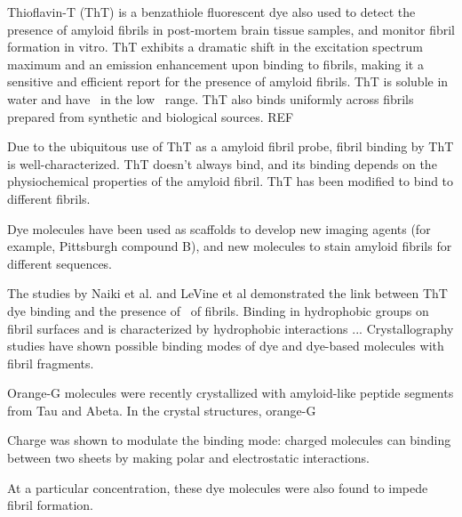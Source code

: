 Thioflavin-T (ThT) is a benzathiole fluorescent dye also used to detect the presence of amyloid fibrils in post-mortem brain tissue samples, and monitor fibril formation in vitro. ThT exhibits a dramatic shift in the excitation spectrum maximum and an emission enhancement upon binding to fibrils, making it a sensitive and efficient report for the presence of amyloid fibrils.  ThT is soluble in water and have \KD\ in the low \micromolar\ range.  ThT also binds uniformly across fibrils prepared from synthetic and biological sources.
REF

Due to the ubiquitous use of ThT as a amyloid fibril probe, fibril binding by ThT is well-characterized.  ThT doesn't always bind, and its binding depends on the physiochemical properties of the amyloid fibril.  ThT has been modified to bind to different fibrils.\cite{XXX}

Dye molecules have been used as scaffolds to develop new imaging agents (for example, Pittsburgh compound B), and new molecules to stain amyloid fibrils for different sequences. 


The studies by Naiki et al. and LeVine et al demonstrated the link between ThT dye binding and the presence of \crossbs\ of fibrils. Binding in hydrophobic groups on fibril surfaces and is characterized by hydrophobic interactions ...
Crystallography studies have shown possible binding modes of dye and dye-based molecules with fibril fragments.\cite{XXX}

Orange-G molecules were recently crystallized with amyloid-like peptide segments from Tau and Abeta.  In the crystal structures, orange-G 

Charge was shown to modulate the binding mode: charged molecules can binding between two sheets by making polar and electrostatic interactions.

At a particular concentration, these dye molecules were also found to impede fibril formation.\cite{XXX}

